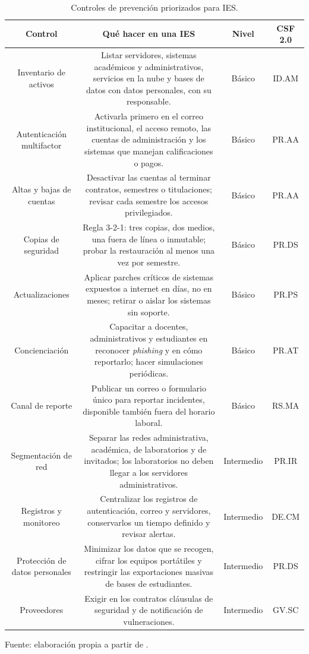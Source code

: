 \documentclass[11pt,a4paper,oneside]{report}
\begin{document}
\begin{table}[htbp]
  \centering
  \caption{Controles de prevención priorizados para IES.}
  \label{tab:controles}
  \small
  \begin{tabular}{|C{0.23}|C{0.47}|C{0.15}|C{0.15}|}
    \hline
    \textbf{Control} & \textbf{Qué hacer en una IES} & \textbf{Nivel} & \textbf{CSF 2.0} \\
    \hline
    Inventario de activos & Listar servidores, sistemas académicos y administrativos, servicios en la nube y bases de datos con datos personales, con su responsable. & Básico & ID.AM \\
    \hline
    Autenticación multifactor & Activarla primero en el correo institucional, el acceso remoto, las cuentas de administración y los sistemas que manejan calificaciones o pagos. & Básico & PR.AA \\
    \hline
    Altas y bajas de cuentas & Desactivar las cuentas al terminar contratos, semestres o titulaciones; revisar cada semestre los accesos privilegiados. & Básico & PR.AA \\
    \hline
    Copias de seguridad & Regla 3-2-1: tres copias, dos medios, una fuera de línea o inmutable; probar la restauración al menos una vez por semestre. & Básico & PR.DS \\
    \hline
    Actualizaciones & Aplicar parches críticos de sistemas expuestos a internet en días, no en meses; retirar o aislar los sistemas sin soporte. & Básico & PR.PS \\
    \hline
    Concienciación & Capacitar a docentes, administrativos y estudiantes en reconocer \textit{phishing} y en cómo reportarlo; hacer simulaciones periódicas. & Básico & PR.AT \\
    \hline
    Canal de reporte & Publicar un correo o formulario único para reportar incidentes, disponible también fuera del horario laboral. & Básico & RS.MA \\
    \hline
    Segmentación de red & Separar las redes administrativa, académica, de laboratorios y de invitados; los laboratorios no deben llegar a los servidores administrativos. & Intermedio & PR.IR \\
    \hline
    Registros y monitoreo & Centralizar los registros de autenticación, correo y servidores, conservarlos un tiempo definido y revisar alertas. & Intermedio & DE.CM \\
    \hline
    Protección de datos personales & Minimizar los datos que se recogen, cifrar los equipos portátiles y restringir las exportaciones masivas de bases de estudiantes. & Intermedio & PR.DS \\
    \hline
    Proveedores & Exigir en los contratos cláusulas de seguridad y de notificación de vulneraciones. & Intermedio & GV.SC \\
    \hline
  \end{tabular}
  \par\raggedright
  {\footnotesize Fuente: elaboración propia a partir de \cite{nistcsf2024,iso27001_2022,cis2024}.\par}
\end{table}
\end{document}
